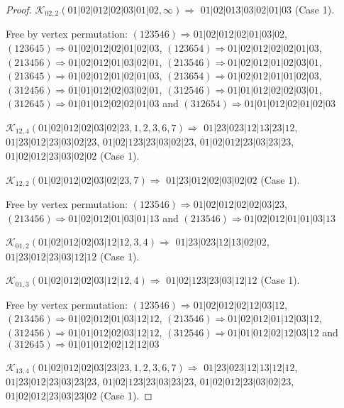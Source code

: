 \documentclass[12pt]{article}
\theoremstyle{plain}
\theoremstyle{definition}
\theoremstyle{remark}
\newcommand{\fancy}[1]{\mathcal{#1}}
\def\K{\fancy{K}}
\begin{document}
\begin{proof}
	$\K_{02,2}(01|02|012|02|03|01|02,\infty)\Rightarrow $ $01|02|013|03|02|01|03$ (Case 1).
	
	
	
	Free by vertex permutation: $(1 2 3 5 4 6)\Rightarrow 01|02|012|02|01|03|02$, $(1 2 3 6 4 5)\Rightarrow 01|02|012|02|01|02|03$, $(1 2 3 6 5 4)\Rightarrow 01|02|012|02|02|01|03$, $(2 1 3 4 5 6)\Rightarrow 01|02|012|01|03|02|01$, $(2 1 3 5 4 6)\Rightarrow 01|02|012|01|02|03|01$, $(2 1 3 6 4 5)\Rightarrow 01|02|012|01|02|01|03$, $(2 1 3 6 5 4)\Rightarrow 01|02|012|01|01|02|03$, $(3 1 2 4 5 6)\Rightarrow 01|01|012|02|03|02|01$, $(3 1 2 5 4 6)\Rightarrow 01|01|012|02|02|03|01$, $(3 1 2 6 4 5)\Rightarrow 01|01|012|02|02|01|03$ and $(3 1 2 6 5 4)\Rightarrow 01|01|012|02|01|02|03$
	
	
	
	\bigskip
	
	$\K_{12,4}(01|02|012|02|03|02|23,1, 2, 3, 6, 7)\Rightarrow $ $01|23|023|12|13|23|12$, $01|23|012|23|03|02|23$, $01|02|123|23|03|02|23$, $01|02|012|23|03|23|23$, $01|02|012|23|03|02|02$ (Case 1).
	
	$\K_{12,2}(01|02|012|02|03|02|23,7)\Rightarrow $ $01|23|012|02|03|02|02$ (Case 1).
	
	
	
	Free by vertex permutation: $(1 2 3 5 4 6)\Rightarrow 01|02|012|02|02|03|23$, $(2 1 3 4 5 6)\Rightarrow 01|02|012|01|03|01|13$ and $(2 1 3 5 4 6)\Rightarrow 01|02|012|01|01|03|13$
	
	
	
	\bigskip
	
	$\K_{01,2}(01|02|012|02|03|12|12,3, 4)\Rightarrow $ $01|23|023|12|13|02|02$, $01|23|012|23|03|12|12$ (Case 1).
	
	$\K_{01,3}(01|02|012|02|03|12|12,4)\Rightarrow $ $01|02|123|23|03|12|12$ (Case 1).
	
	
	
	Free by vertex permutation: $(1 2 3 5 4 6)\Rightarrow 01|02|012|02|12|03|12$, $(2 1 3 4 5 6)\Rightarrow 01|02|012|01|03|12|12$, $(2 1 3 5 4 6)\Rightarrow 01|02|012|01|12|03|12$, $(3 1 2 4 5 6)\Rightarrow 01|01|012|02|03|12|12$, $(3 1 2 5 4 6)\Rightarrow 01|01|012|02|12|03|12$ and $(3 1 2 6 4 5)\Rightarrow 01|01|012|02|12|12|03$
	
	
	
	\bigskip
	
	$\K_{13,4}(01|02|012|02|03|23|23,1, 2, 3, 6, 7)\Rightarrow $ $01|23|023|12|13|12|12$, $01|23|012|23|03|23|23$, $01|02|123|23|03|23|23$, $01|02|012|23|03|02|23$, $01|02|012|23|03|23|02$ (Case 1).
	

\end{proof}
\end{document}
